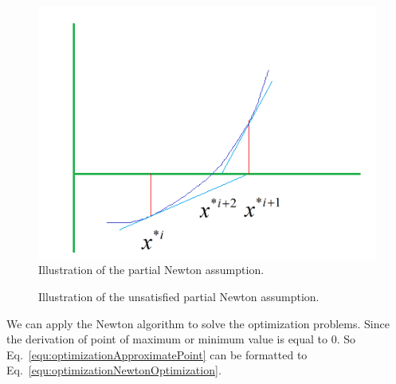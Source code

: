 \documentclass[runningheads,openany]{xhlPaper}
\begin{document}
\begin{figure}
\centering
\includegraphics[width=0.7\linewidth]{optimizationNewtonPointClosed0Type1}
\caption{Illustration of the partial Newton assumption.}
\label{fig:optimizationNewtonPointClosed0Type1}
\end{figure}

\begin{figure}
\centering
{}
\caption{Illustration of the unsatisfied partial Newton assumption.}
\label{fig:optimizationUnSatisfiedPartialNewtonAssumption}
\end{figure}

We can apply the Newton algorithm to solve the optimization problems. Since the derivation of point of maximum or minimum value is equal to 0. So Eq.~\ref{equ:optimizationApproximatePoint} can be formatted to Eq.~\ref{equ:optimizationNewtonOptimization}.
\end{document}
